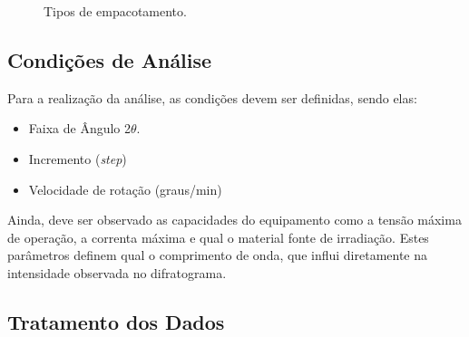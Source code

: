 \begin{figure}[ht]
    \center
    \begin{minipage}{10cm}
     \caption{Tipos de empacotamento.}\label{figureEmpacotamentoPortaAmostra} 
     \end{minipage}
\end{figure}

\subsection{Condições de Análise}
Para a realização da análise, as condições devem ser definidas, sendo elas:
\begin{itemize}
    \item Faixa de Ângulo 2$\theta$.
    \item Incremento (\textit{step})
    \item Velocidade de rotação (graus/min)
\end{itemize}

Ainda, deve ser observado as capacidades do equipamento como a tensão máxima
de operação, a correnta máxima e qual o material fonte de irradiação. Estes
parâmetros definem qual o comprimento de onda, que influi diretamente na intensidade
observada no difratograma.

\subsection{Tratamento dos Dados}

